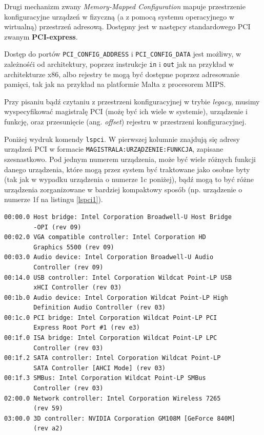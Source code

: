 \documentclass[shortabstract,inz]{iithesis}
\begin{document}
Drugi mechanizm zwany \textit{Memory-Mapped Configuration} mapuje przestrzenie
konfiguracyjne urządzeń w fizyczną (a z pomocą systemu operacyjnego w wirtualną) przestrzeń adresową.
Dostępny jest w następcy standardowego PCI zwanym \textbf{PCI-express}.

Dostęp do portów \texttt{PCI\_CONFIG\_ADDRESS} i \texttt{PCI\_CONFIG\_DATA} jest możliwy, 
w zależnośći od architektury, poprzez 
instrukcje \texttt{in} i \texttt{out} jak na przykład w architekturze x86, 
albo rejestry te mogą być  dostępne poprzez adresowanie pamięci, tak jak 
na przykład na platformie Malta z procesorem MIPS.


Przy pisaniu bądź czytaniu z przestrzeni konfiguracyjnej w trybie \textit{legacy}, musimy wyspecyfikować 
magistralę PCI (możę być ich wiele w systemie), urządzenie i funkcję, oraz przesunięcie (ang. \textit{offset}) 
rejestru w przestrzeni konfiguracyjnej.

Poniżej wydruk komendy \texttt{lspci}. W pierwszej kolumnie znajdują się adresy
urządzeń PCI w formacie \texttt{MAGISTRALA:URZĄDZENIE:FUNKCJA}, zapisane szesnastkowo.
Pod jednym numerem urządzenia, może być wiele różnych funkcji danego urządzenia,
które mogą przez system być traktowane jako osobne byty
(tak jak w wypadku urządzenia o numerze 1c poniżej), bądź mogą to być różne urządzenia
zorganizowane w bardziej kompaktowy sposób (np. urządzenie o numerze 1f na listingu \ref{lspci1}).

\begin{lstlisting}[caption=Część wydruku komendy lspci \protect\footnotemark, label={lspci1}]
00:00.0 Host bridge: Intel Corporation Broadwell-U Host Bridge 
        -OPI (rev 09)
00:02.0 VGA compatible controller: Intel Corporation HD 
        Graphics 5500 (rev 09)
00:03.0 Audio device: Intel Corporation Broadwell-U Audio 
        Controller (rev 09)
00:14.0 USB controller: Intel Corporation Wildcat Point-LP USB 
        xHCI Controller (rev 03)
00:1b.0 Audio device: Intel Corporation Wildcat Point-LP High 
        Definition Audio Controller (rev 03)
00:1c.0 PCI bridge: Intel Corporation Wildcat Point-LP PCI 
        Express Root Port #1 (rev e3)
00:1f.0 ISA bridge: Intel Corporation Wildcat Point-LP LPC 
        Controller (rev 03)
00:1f.2 SATA controller: Intel Corporation Wildcat Point-LP 
        SATA Controller [AHCI Mode] (rev 03)
00:1f.3 SMBus: Intel Corporation Wildcat Point-LP SMBus 
        Controller (rev 03)
02:00.0 Network controller: Intel Corporation Wireless 7265 
        (rev 59)
03:00.0 3D controller: NVIDIA Corporation GM108M [GeForce 840M] 
        (rev a2)  
\end{lstlisting}
\end{document}
